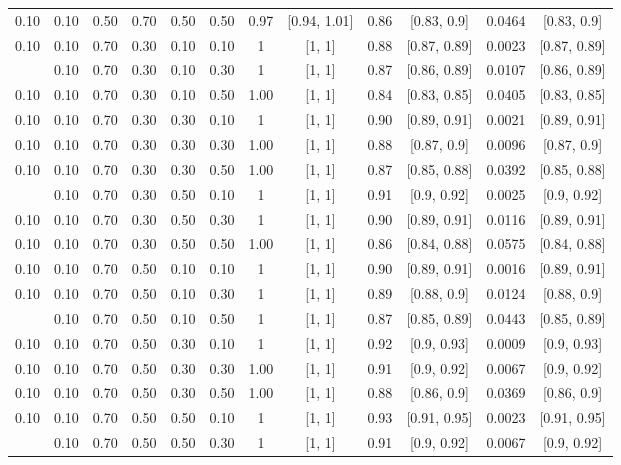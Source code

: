 \documentclass[
  11pt,
]{article}
\begin{document}
\begin{landscape}
\begin{ThreePartTable}
\begin{longtable}[t]{cccccccccccc}
0.10 & 0.10 & 0.50 & 0.70 & 0.50 & 0.50 & 0.97 & {}[0.94, 1.01] & 0.86 & {}[0.83, 0.9] & 0.0464 & {}[0.83, 0.9]\\
0.10 & 0.10 & 0.70 & 0.30 & 0.10 & 0.10 & 1 & {}[1, 1] & 0.88 & {}[0.87, 0.89] & 0.0023 & {}[0.87, 0.89]\\
\addlinespace
0.10 & 0.10 & 0.70 & 0.30 & 0.10 & 0.30 & 1 & {}[1, 1] & 0.87 & {}[0.86, 0.89] & 0.0107 & {}[0.86, 0.89]\\
0.10 & 0.10 & 0.70 & 0.30 & 0.10 & 0.50 & 1.00 & {}[1, 1] & 0.84 & {}[0.83, 0.85] & 0.0405 & {}[0.83, 0.85]\\
0.10 & 0.10 & 0.70 & 0.30 & 0.30 & 0.10 & 1 & {}[1, 1] & 0.90 & {}[0.89, 0.91] & 0.0021 & {}[0.89, 0.91]\\
0.10 & 0.10 & 0.70 & 0.30 & 0.30 & 0.30 & 1.00 & {}[1, 1] & 0.88 & {}[0.87, 0.9] & 0.0096 & {}[0.87, 0.9]\\
0.10 & 0.10 & 0.70 & 0.30 & 0.30 & 0.50 & 1.00 & {}[1, 1] & 0.87 & {}[0.85, 0.88] & 0.0392 & {}[0.85, 0.88]\\
\addlinespace
0.10 & 0.10 & 0.70 & 0.30 & 0.50 & 0.10 & 1 & {}[1, 1] & 0.91 & {}[0.9, 0.92] & 0.0025 & {}[0.9, 0.92]\\
0.10 & 0.10 & 0.70 & 0.30 & 0.50 & 0.30 & 1 & {}[1, 1] & 0.90 & {}[0.89, 0.91] & 0.0116 & {}[0.89, 0.91]\\
0.10 & 0.10 & 0.70 & 0.30 & 0.50 & 0.50 & 1.00 & {}[1, 1] & 0.86 & {}[0.84, 0.88] & 0.0575 & {}[0.84, 0.88]\\
0.10 & 0.10 & 0.70 & 0.50 & 0.10 & 0.10 & 1 & {}[1, 1] & 0.90 & {}[0.89, 0.91] & 0.0016 & {}[0.89, 0.91]\\
0.10 & 0.10 & 0.70 & 0.50 & 0.10 & 0.30 & 1 & {}[1, 1] & 0.89 & {}[0.88, 0.9] & 0.0124 & {}[0.88, 0.9]\\
\addlinespace
0.10 & 0.10 & 0.70 & 0.50 & 0.10 & 0.50 & 1 & {}[1, 1] & 0.87 & {}[0.85, 0.89] & 0.0443 & {}[0.85, 0.89]\\
0.10 & 0.10 & 0.70 & 0.50 & 0.30 & 0.10 & 1 & {}[1, 1] & 0.92 & {}[0.9, 0.93] & 0.0009 & {}[0.9, 0.93]\\
0.10 & 0.10 & 0.70 & 0.50 & 0.30 & 0.30 & 1.00 & {}[1, 1] & 0.91 & {}[0.9, 0.92] & 0.0067 & {}[0.9, 0.92]\\
0.10 & 0.10 & 0.70 & 0.50 & 0.30 & 0.50 & 1.00 & {}[1, 1] & 0.88 & {}[0.86, 0.9] & 0.0369 & {}[0.86, 0.9]\\
0.10 & 0.10 & 0.70 & 0.50 & 0.50 & 0.10 & 1 & {}[1, 1] & 0.93 & {}[0.91, 0.95] & 0.0023 & {}[0.91, 0.95]\\
\addlinespace
0.10 & 0.10 & 0.70 & 0.50 & 0.50 & 0.30 & 1 & {}[1, 1] & 0.91 & {}[0.9, 0.92] & 0.0067 & {}[0.9, 0.92]\\

\end{longtable}
\end{ThreePartTable}
\end{landscape}
\end{document}
